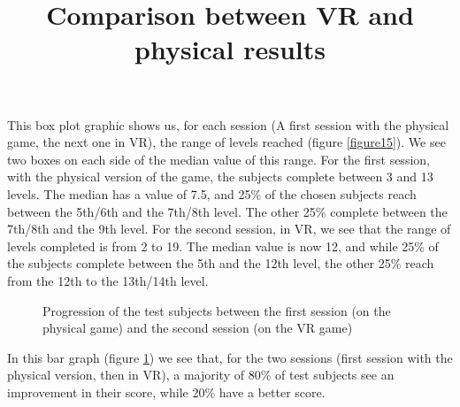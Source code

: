 \documentclass[12pt, openany, twocolumn]{article}
\begin{document}
            This box plot graphic shows us, for each session (A first session with the physical game, the next one in VR), the range of levels reached (figure \ref{figure15}).
            We see two boxes on each side of the median value of this range.
            For the first session, with the physical version of the game, the subjects complete between 3 and 13 levels. The median has a value of 7.5, and 25\% of the chosen subjects reach between the 5th/6th and the 7th/8th level. The other 25\% complete between the 7th/8th and the 9th level.
            For the second session, in VR, we see that the range of levels completed is from 2 to 19. The median value is now 12, and while 25\% of the subjects complete between the 5th and the 12th level, the other 25\% reach from the 12th to the 13th/14th level.

                \begin{figure}[H]
                    \centering
                    \setlength{\fboxsep}{0pt}
                    \caption{Progression of the test subjects between the first session (on the physical game) and the second session (on the VR game)}
                    \label{figure16}
                \end{figure}

            In this bar graph (figure \ref{figure16}) we see that, for the two sessions (first session with the physical version, then in VR), a majority of 80\% of test subjects see an improvement in their score, while 20\% have a better score.
            \\

            \noindent \title{\textbf{Comparison between VR and physical results}} \vspace{0.25cm}
\end{document}
